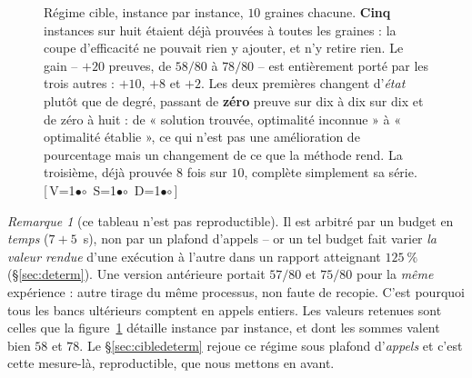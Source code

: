 \documentclass[11pt,a4paper]{article}
\theoremstyle{plain}
\theoremstyle{remark}
\newtheorem{remark}{Remarque}
\newcommand{\cfgm}[1]{\ifnum#1=1$\bullet$\else$\circ$\fi}
\newcommand{\conf}[3]{%
  \textsf{\footnotesize[\,V\cfgm{#1}\ S\cfgm{#2}\ D\cfgm{#3}\,]}}
\begin{document}
\begin{figure}[H]
\centering
{}
\caption{Régime cible, instance par instance, $10$ graines chacune.
\textbf{Cinq} instances sur huit étaient déjà prouvées à toutes les
graines : la coupe d'efficacité ne pouvait rien y ajouter, et n'y retire
rien. Le gain -- $+20$ preuves, de $58/80$ à $78/80$ -- est entièrement
porté par les trois autres : $+10$, $+8$ et $+2$. Les deux premières
changent d'\emph{état} plutôt que de degré, passant de \textbf{zéro} preuve
sur dix à dix sur dix et de zéro à huit : de « solution trouvée, optimalité
inconnue » à « optimalité établie », ce qui n'est pas une amélioration de
pourcentage mais un changement de ce que la méthode rend. La troisième,
déjà prouvée $8$ fois sur $10$, complète simplement sa série.\ \conf{0}{0}{0}}
\label{fig:cible}
\end{figure}

\begin{remark}[ce tableau n'est pas reproductible]
Il est arbitré par un budget en \emph{temps} ($7+5$~s), non par un plafond
d'appels -- or un tel budget fait varier \emph{la valeur rendue} d'une
exécution à l'autre dans un rapport atteignant $125\ \%$
(§\ref{sec:determ}). Une version antérieure portait $57/80$ et $75/80$ pour
la \emph{même} expérience : autre tirage du même processus, non faute de
recopie. C'est pourquoi tous les bancs ultérieurs comptent en appels
entiers. Les valeurs retenues sont celles que la figure~\ref{fig:cible}
détaille instance par instance, et dont les sommes valent bien $58$ et
$78$. Le §\ref{sec:cibledeterm} rejoue ce régime sous plafond d'\emph{appels}
et c'est cette mesure-là, reproductible, que nous mettons en avant.
\end{remark}
\end{document}
